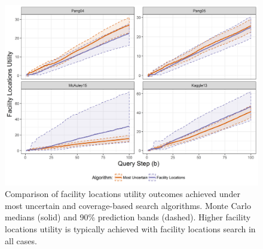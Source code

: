 \documentclass[letterpaper]{article} %
\begin{document}
\begin{figure}[t]
 \centering
  \includegraphics[width=\textwidth]{flUtilPlaceholder.png}
  \caption{Comparison of facility locations utility outcomes achieved under most uncertain and coverage-based search algorithms. Monte Carlo medians (solid) and 90\% prediction bands (dashed).  Higher facility locations utility is typically achieved with facility locations search in all cases.}
  \label{fig:flutil}
\end{figure}
\end{document}
